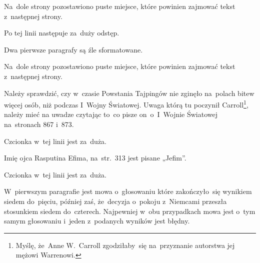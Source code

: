 \documentclass[a4paper,11pt]{article}
\numberwithin{equation}{section}
\begin{document}
\VerSpaceFour





\noindent
{} Na~dole strony pozostawiono puste miejsce, które powinien
zajmować tekst z~następnej strony.

\VerSpaceFour





\noindent
{} Po tej linii następuje za~duży odstęp.

\VerSpaceFour





\noindent
{} Dwa pierwsze paragrafy są źle sformatowane.

\VerSpaceFour





\noindent
{} Na~dole strony pozostawiono puste miejsce, które powinien
zajmować tekst z~następnej strony.

\VerSpaceFour





\noindent
{} Należy sprawdzić, czy w~czasie Powstania Tajpingów nie zginęło
na~polach bitew więcej osób, niż podczas I~Wojny Światowej. Uwaga którą tu
poczynił Carroll\footnote{Myślę, że~Anne W.~Carroll zgodziłaby~się
  na~przyznanie autorstwa jej mężowi Warrenowi.}, należy mieć na uwadze
czytając to~co pisze on~o~I~Wojnie Światowej na~stronach 867 i~873.

\VerSpaceFour





\noindent
{} Czcionka w~tej linii jest za~duża.

\VerSpaceFour





\noindent
{} Imię ojca Rasputina Efima, na~str.~313 jest pisane
„Jefim”.

\VerSpaceFour





\noindent
{} Czcionka w~tej linii jest za~duża.

\VerSpaceFour





\noindent
{} W~pierwszym paragrafie jest mowa o~głosowaniu które
zakończyło~się wynikiem siedem do~pięciu, później zaś, że~decyzja
o~pokoju z~Niemcami przeszła stosunkiem siedem do~czterech. Najpewniej
w~obu przypadkach mowa jest o~tym samym głosowaniu i~jeden z~podanych
wyników jest błędny.
\end{document}
